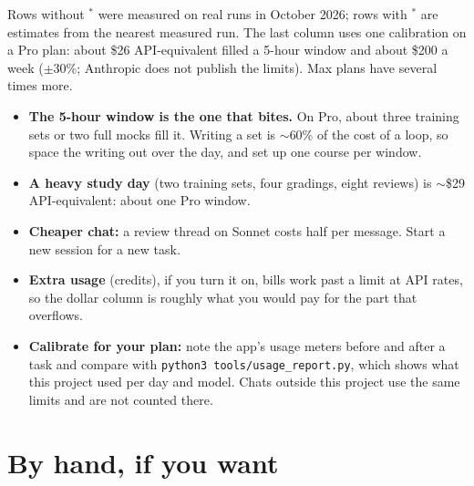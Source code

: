 \documentclass[a4paper,10pt]{article}
\begin{document}
{\small\color{muted} Rows without $^*$ were measured on real runs in October 2026; rows with $^*$
are estimates from the nearest measured run. The last column uses one calibration on a Pro
plan: about \$26 API-equivalent filled a 5-hour window and about \$200 a week ($\pm$30\%; Anthropic
does not publish the limits). Max plans have several times more.}

\begin{itemize}[leftmargin=1.1em]
  \item \textbf{The 5-hour window is the one that bites.} On Pro, about three training sets or two
    full mocks fill it. Writing a set is $\sim$60\% of the cost of a loop, so space the writing out
    over the day, and set up one course per window.
  \item \textbf{A heavy study day} (two training sets, four gradings, eight reviews) is $\sim$\$29
    API-equivalent: about one Pro window.
  \item \textbf{Cheaper chat:} a review thread on Sonnet costs half per message. Start a new session
    for a new task.
  \item \textbf{Extra usage} (credits), if you turn it on, bills work past a limit at API rates, so the
    dollar column is roughly what you would pay for the part that overflows.
  \item \textbf{Calibrate for your plan:} note the app's usage meters before and after a task and
    compare with \texttt{python3 tools/usage\_report.py}, which shows what this project used per day
    and model. Chats outside this project use the same limits and are not counted there.
\end{itemize}

\section{By hand, if you want}
\end{document}
